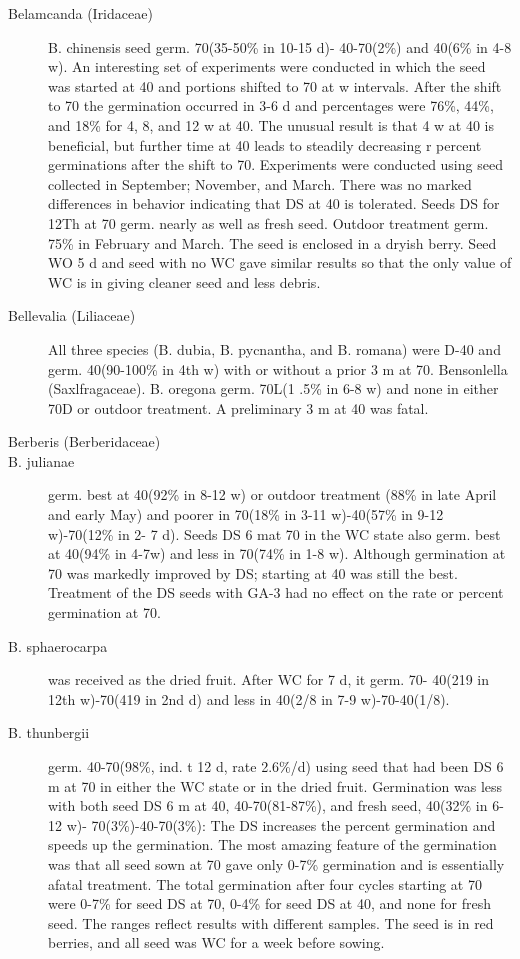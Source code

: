 \begin{description}
\item[Belamcanda (Iridaceae)] B. chinensis seed germ. 70(35-50\% in 10-15 d)-
40-70(2\%) and 40(6\% in 4-8 w). An interesting set of experiments were conducted in
which the seed was started at 40 and portions shifted to 70 at w intervals. After the
shift to 70 the germination occurred in 3-6 d and percentages were 76\%, 44\%, and
18\% for 4, 8, and 12 w at 40. The unusual result is that 4 w at 40 is beneficial, but
further time at 40 leads to steadily decreasing r percent germinations after the shift to
70. Experiments were conducted using seed collected in September; November, and
March. There was no marked differences in behavior indicating that DS at 40 is
tolerated. Seeds DS for 12Th at 70 germ. nearly as well as fresh seed. Outdoor
treatment germ. 75\% in February and March. The seed is enclosed in a dryish berry.
Seed WO 5 d and seed with no WC gave similar results so that the only value of WC is
in giving cleaner seed and less debris.
\item[Bellevalia (Liliaceae)] All three species (B. dubia, B. pycnantha, and B.
romana) were D-40 and germ. 40(90-100\% in 4th w) with or without a prior 3 m at 70.
Bensonlella (Saxlfragaceae). B. oregona germ. 70L(1 .5\% in 6-8 w) and
none in either 70D or outdoor treatment. A preliminary 3 m at 40 was fatal.

\item[Berberis (Berberidaceae)]
\item[B. julianae] germ. best at 40(92\% in 8-12 w) or outdoor treatment (88\% in late
April and early May) and poorer in 70(18\% in 3-11 w)-40(57\% in 9-12 w)-70(12\% in 2-
7 d). Seeds DS 6 mat 70 in the WC state also germ. best at 40(94\% in 4-7w) and
less in 70(74\% in 1-8 w). Although germination at 70 was markedly improved by DS;
starting at 40 was still the best. Treatment of the DS seeds with GA-3 had no effect on
the rate or percent germination at 70.
\item[B. sphaerocarpa] was received as the dried fruit. After WC for 7 d, it germ. 70-
40(219 in 12th w)-70(419 in 2nd d) and less in 40(2/8 in 7-9 w)-70-40(1/8).
\item[B. thunbergii] germ. 40-70(98\%, ind. t 12 d, rate 2.6\%/d) using seed that had
been DS 6 m at 70 in either the WC state or in the dried fruit. Germination was less
with both seed DS 6 m at 40, 40-70(81-87\%), and fresh seed, 40(32\% in 6-12 w)-
70(3\%)-40-70(3\%): The DS increases the percent germination and speeds up the
germination. The most amazing feature of the germination was that all seed sown at
70 gave only 0-7\% germination and is essentially afatal treatment. The total
germination after four cycles starting at 70 were 0-7\% for seed DS at 70, 0-4\% for seed
DS at 40, and none for fresh seed. The ranges reflect results with different samples.
The seed is in red berries, and all seed was WC for a week before sowing.


\end{description}
